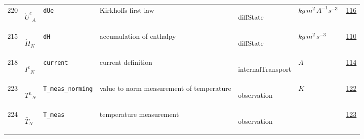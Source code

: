 \begin{longtable}{|p{1cm}|p{2.5cm}|p{4.5cm}|p{8cm}|p{3.0cm}|p{3cm}|p{1cm}|}
            220
             & \hypertarget{"v:220"}{ $ {{\dot{U}^e}}{_{A}} $}
             & \verb|dUe|
             & Kirkhoffs first law
             & \begin{lay}diffState \end{lay}
             & $ kg \,m^{2} \,A^{-1} s^{-3} \, $
             &                 \hyperlink{"e:116"}{ 116 }
                 \\
            215
             & \hypertarget{"v:215"}{ $ {{\dot{H}}}{_{N}} $}
             & \verb|dH|
             & accumulation of enthalpy
             & \begin{lay}diffState \end{lay}
             & $ kg \,m^{2} \,s^{-3} \, $
             &                 \hyperlink{"e:110"}{ 110 }
                 \\
            218
             & \hypertarget{"v:218"}{ $ {{I^e}}{_{N}} $}
             & \verb|current|
             & current definition
             & \begin{lay}internalTransport \end{lay}
             & $ A \, $
             &                 \hyperlink{"e:114"}{ 114 }
                 \\
            223
             & \hypertarget{"v:223"}{ $ {{T^n}}{_{N}} $}
             & \verb|T_meas_norming|
             & value to norm measurement of temperature
             & \begin{lay}observation \end{lay}
             & $ K \, $
             &                 \hyperlink{"e:122"}{ 122 }
                 \\
            224
             & \hypertarget{"v:224"}{ $ {{\bar{T}}}{_{N}} $}
             & \verb|T_meas|
             & temperature measurement
             & \begin{lay}observation \end{lay}
             & $  $
             &                 \hyperlink{"e:123"}{ 123 }
                 \\
    \end{longtable}